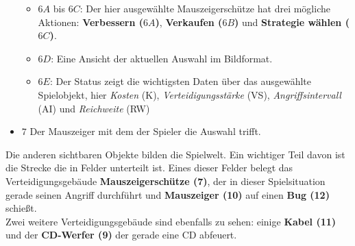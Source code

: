 \begin{itemize}
\begin{itemize}
		\item{$6 A$ bis $6 C$: Der hier ausgewählte Mauszeigerschütze hat drei mögliche Aktionen: \textbf{Verbessern ($6 A$)}, \textbf{Verkaufen ($6 B$)} und \textbf{Strategie wählen ($6 C$)}.}
		\item{$6 D$: Eine Ansicht der aktuellen Auswahl im Bildformat.}
		\item{$6 E$: Der Status zeigt die wichtigsten Daten über das ausgewählte Spielobjekt, hier \textit{Kosten} (K), \textit{Verteidigungsstärke} (VS), \textit{Angriffsintervall }(AI) und \textit{Reichweite} (RW)}
	\end{itemize}
	\item {$7$ Der Mauszeiger mit dem der Spieler die Auswahl trifft.} 
\end{itemize}
Die anderen sichtbaren Objekte bilden die Spielwelt. Ein wichtiger Teil davon ist die Strecke die in Felder unterteilt ist. Eines dieser Felder belegt das Verteidigungsgebäude \textbf{Mauszeigerschütze (7)}, der in dieser Spielsituation gerade seinen Angriff durchführt und \textbf{Mauszeiger (10)} auf einen \textbf{Bug (12)} schießt.\\
Zwei weitere Verteidigungsgebäude sind ebenfalls zu sehen: einige \textbf{Kabel (11)} und der \textbf{CD-Werfer (9)} der gerade eine CD abfeuert.
